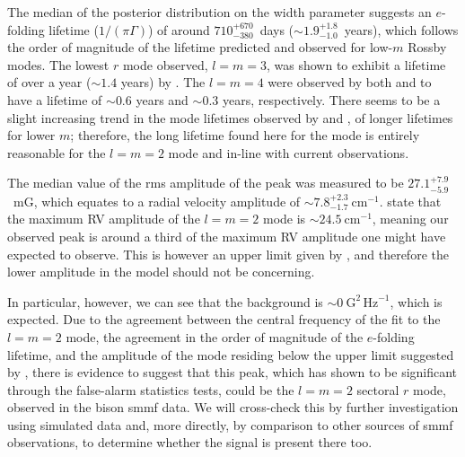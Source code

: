 The median of the posterior distribution on the width parameter suggests an $e$-folding lifetime ($1/(\pi \Gamma)$) of around $710^{+670}_{-380}$~days ($\sim 1.9^{+1.8}_{-1.0}$~years), which follows the order of magnitude of the lifetime predicted and observed for low-$m$ Rossby modes. The lowest $r$ mode observed, $l=m=3$, was shown to exhibit a lifetime of over a year ($\sim 1.4$ years) by \citet{liang_time-distance_2019}. The $l=m=4$ were observed by both \citet{loptien_global-scale_2018} and \citet{liang_time-distance_2019} to have a lifetime of $\sim 0.6$ years and $\sim 0.3$ years, respectively. There seems to be a slight increasing trend in the mode lifetimes observed by \citet{loptien_global-scale_2018} and \citet{liang_time-distance_2019}, of longer lifetimes for lower $m$; therefore, the long lifetime found here for the mode is entirely reasonable for the $l=m=2$ mode and in-line with current observations.

The median value of the \gls{rms} amplitude of the peak was measured to be $27.1_{-5.9}^{+7.9}$~mG, which equates to a radial velocity amplitude of $\sim 7.8_{-1.7}^{+2.3}~\mathrm{cm}^{-1}$. \citet{lanza_sectoral_2019} state that the maximum RV amplitude of the $l=m=2$ mode is $\sim 24.5~\mathrm{cm}^{-1}$, meaning our observed peak is around a third of the maximum RV amplitude one might have expected to observe. This is however an upper limit given by \citet{lanza_sectoral_2019}, and therefore the lower amplitude in the model should not be concerning.

In particular, however, we can see that the background is $\sim 0~\mathrm{G}^2\,\mathrm{Hz}^{-1}$, which is expected. Due to the agreement between the central frequency of the fit to the $l=m=2$ mode, the agreement in the order of magnitude of the $e$-folding lifetime, and the amplitude of the mode residing below the upper limit suggested by \citet{lanza_sectoral_2019}, there is evidence to suggest that this peak, which has shown to be significant through the false-alarm statistics tests, could be the $l=m=2$ sectoral $r$ mode, observed in the \gls{bison} \gls{smmf} data. We will cross-check this by further investigation using simulated data and, more directly, by comparison to other sources of \gls{smmf} observations, to determine whether the signal is present there too.







